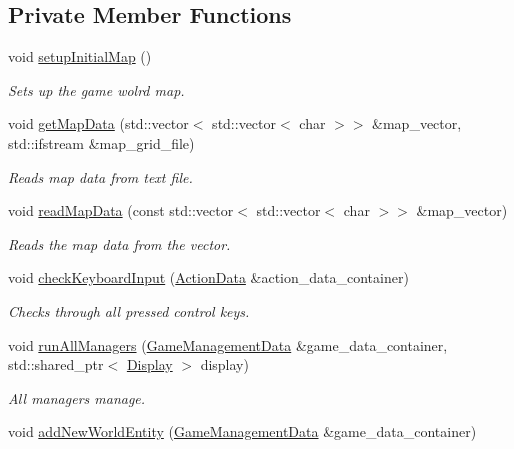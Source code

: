 \subsection*{Private Member Functions}
\begin{DoxyCompactItemize}
\item 
void \hyperlink{classGame_ad0f1180499fb33b89deb50da6c1fdd78}{setup\-Initial\-Map} ()
\begin{DoxyCompactList}\small\item\em Sets up the game wolrd map. \end{DoxyCompactList}\item 
void \hyperlink{classGame_ad43265203e4e3e90ee91eb1fedbc06d4}{get\-Map\-Data} (std\-::vector$<$ std\-::vector$<$ char $>$$>$ \&map\-\_\-vector, std\-::ifstream \&map\-\_\-grid\-\_\-file)
\begin{DoxyCompactList}\small\item\em Reads map data from text file. \end{DoxyCompactList}\item 
void \hyperlink{classGame_a742dfb46a327c277b5b5711052919d21}{read\-Map\-Data} (const std\-::vector$<$ std\-::vector$<$ char $>$$>$ \&map\-\_\-vector)
\begin{DoxyCompactList}\small\item\em Reads the map data from the vector. \end{DoxyCompactList}\item 
void \hyperlink{classGame_a9fbdc107c782dba1f2debf7ee347bb7d}{check\-Keyboard\-Input} (\hyperlink{classActionData}{Action\-Data} \&action\-\_\-data\-\_\-container)
\begin{DoxyCompactList}\small\item\em Checks through all pressed control keys. \end{DoxyCompactList}\item 
void \hyperlink{classGame_a39814b41ab7d5bc1af48bed69500a2be}{run\-All\-Managers} (\hyperlink{classGameManagementData}{Game\-Management\-Data} \&game\-\_\-data\-\_\-container, std\-::shared\-\_\-ptr$<$ \hyperlink{classDisplay}{Display} $>$ display)
\begin{DoxyCompactList}\small\item\em All managers manage. \end{DoxyCompactList}\item 
void \hyperlink{classGame_abd126d710f269c525c2f26e290444cf7}{add\-New\-World\-Entity} (\hyperlink{classGameManagementData}{Game\-Management\-Data} \&game\-\_\-data\-\_\-container)

\end{DoxyCompactItemize}
